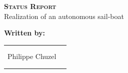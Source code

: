 
\begingroup
\thispagestyle{empty}
\begin{center}
\vspace*{2cm}
{\Huge \textsc{\textbf{Status Report}}}\\


\vspace*{2cm}
{\huge Realization of an autonomous sail-boat}\par %
\end{center}

\vspace*{1.5cm}
\textbf{\large Written by:} 
\begin{center}
{\large
\begin{tabular}{cc}
\\
\\
\\
Philippe Chuzel\\
\\
\\
\end{tabular}}
\end{center}


\endgroup

